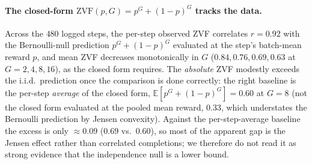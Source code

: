 \paragraph{The closed-form $\mathrm{ZVF}(p,G)=p^{G}+(1-p)^{G}$ tracks the data.}
Across the $480$ logged steps, the per-step observed ZVF correlates
$r=0.92$ with the Bernoulli-null prediction $p^{G}+(1-p)^{G}$ evaluated at the
step's batch-mean reward $p$, and mean ZVF decreases monotonically in $G$
($0.84, 0.76, 0.69, 0.63$ at $G=2,4,8,16$), as the closed form requires. The
\emph{absolute} ZVF modestly exceeds the i.i.d.\ prediction once the comparison
is done correctly: the right baseline is the per-step \emph{average} of the
closed form, $\mathbb{E}[p^{G}+(1-p)^{G}]=0.60$ at $G{=}8$ (not the closed form
evaluated at the pooled mean reward, $0.33$, which understates the Bernoulli
prediction by Jensen convexity). Against the per-step-average baseline the excess
is only $\approx 0.09$ ($0.69$ vs.\ $0.60$), so most of the apparent gap is the
Jensen effect rather than correlated completions; we therefore do not read it as
strong evidence that the independence null is a lower bound.

